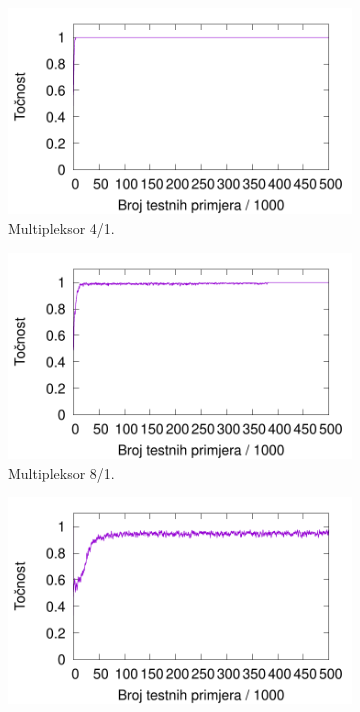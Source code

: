 \documentclass[times, utf8, zavrsni]{fer}
\begin{document}
\begin{figure}[!h]
    \centering
    \begin{subfigure}{0.496\textwidth}
        \centering
        \includegraphics[width=\textwidth]{img/multiplexer/6muxnre.pdf}
        \caption{Multipleksor 4/1.}
        \label{fig:6muxnre}
    \end{subfigure}
    \begin{subfigure}{0.496\textwidth}
        \centering
        \includegraphics[width=\textwidth]{img/multiplexer/11muxnre.pdf}
        \caption{Multipleksor 8/1.}
        \label{fig:11muxnre}
    \end{subfigure}
    \begin{subfigure}{0.496\textwidth}
        \centering
        \includegraphics[width=\textwidth]{img/multiplexer/20muxnre.pdf}

\end{subfigure}
\end{figure}
\end{document}
